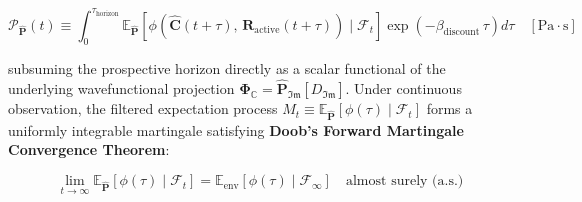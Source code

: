 \documentclass[11pt,a4paper]{article}
\theoremstyle{definition}
\theoremstyle{remark}
\begin{document}
\begin{equation}
\boxed{\mathcal{P}_{\hat{\mathbf{P}}}(t) \equiv \int_0^{\tau_{\text{horizon}}} \mathbb{E}_{\hat{\mathbf{P}}}[ \phi\left(\hat{\mathbf{C}}(t + \tau), \, \mathbf{R}_{\text{active}}(t + \tau)\right) \;\Big|\; \mathcal{F}_t ] \exp\left( -\beta_{\text{discount}} \, \tau \right) d\tau \quad [\mathrm{Pa \cdot s}]}
\end{equation}


subsuming the prospective horizon directly as a scalar functional of the underlying wavefunctional projection $\mathbf{\Phi}_{\mathbb{C}} = \hat{\mathbf{P}}_{\mathfrak{Im}}[D_{\mathfrak{Im}}]$. Under continuous observation, the filtered expectation process $M_t \equiv \mathbb{E}_{\hat{\mathbf{P}}}[\phi(\tau) \mid \mathcal{F}_t]$ forms a uniformly integrable martingale satisfying \textbf{Doob's Forward Martingale Convergence Theorem}:


\begin{equation}
\boxed{\lim_{t \to \infty} \mathbb{E}_{\hat{\mathbf{P}}}[ \phi(\tau) \;\Big|\; \mathcal{F}_t ] = \mathbb{E}_{\text{env}}[ \phi(\tau) \;\Big|\; \mathcal{F}_\infty ] \quad \text{almost surely (a.s.)}}
\end{equation}
\end{document}
